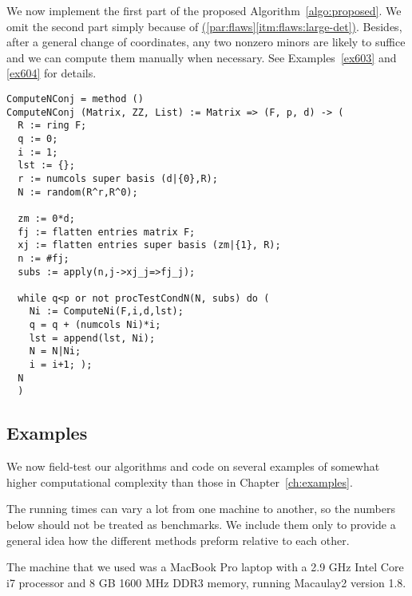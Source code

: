 \documentclass[fleqn,reqno]{amsart}
\renewcommand{\itmref}[2]{{\normalfont\hyperref[#1]{(\ref*{#2}\ref*{#1})}}}
\begin{document}
\begin{paragraf}
\label{code:algo:proposed}
We now implement the first part of the proposed Algorithm~\ref{algo:proposed}.
We omit the second part simply because of \itmref{itm:flaws:large-det}{par:flaws}.
Besides, after a general change of coordinates,
any two nonzero minors are likely to suffice and we can compute them manually when necessary.
See Examples~\ref{ex603} and \ref{ex604} for details.
\begin{verbatim}
ComputeNConj = method ()
ComputeNConj (Matrix, ZZ, List) := Matrix => (F, p, d) -> (
  R := ring F;
  q := 0;
  i := 1;
  lst := {};
  r := numcols super basis (d|{0},R);
  N := random(R^r,R^0);
  
  zm := 0*d;
  fj := flatten entries matrix F;
  xj := flatten entries super basis (zm|{1}, R);
  n := #fj;
  subs := apply(n,j->xj_j=>fj_j);
  
  while q<p or not procTestCondN(N, subs) do (
    Ni := ComputeNi(F,i,d,lst);
    q = q + (numcols Ni)*i;
    lst = append(lst, Ni);
    N = N|Ni;
    i = i+1; );
  N
  )
\end{verbatim}
\end{paragraf}

\subsection{Examples}
\label{sec:long-examples}

\begin{paragraf*}
We now field-test our algorithms and code on several examples of
somewhat higher computational complexity than those in Chapter~\ref{ch:examples}.

The running times can vary a lot from one machine to another,
so the numbers below should not be treated as benchmarks.
We include them only to provide a general idea how the different methods preform
relative to each other.

The machine that we used was a MacBook Pro laptop with
a 2.9 GHz Intel Core i7 processor and 8 GB 1600 MHz DDR3 memory,
running Macaulay2 version 1.8.
\end{paragraf*}
\end{document}

